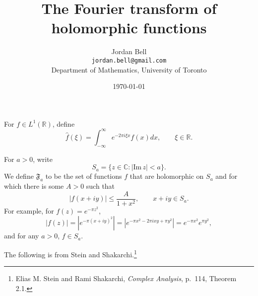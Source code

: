 \documentclass{article}
\def\Im{\ensuremath{\mathrm{Im}}\,}
\theoremstyle{definition}
\begin{document}
\title{The Fourier transform of holomorphic functions}
\author{Jordan Bell\\ \texttt{jordan.bell@gmail.com}\\Department of Mathematics, University of Toronto}
\date{\today}

\maketitle

For $f \in L^1(\mathbb{R})$, define
\[
\widehat{f}(\xi) = \int_{-\infty}^\infty e^{-2\pi i\xi x} f(x) dx,
\qquad \xi \in \mathbb{R}.
\]

For $a>0$, write
\[
S_a = \{z \in \mathbb{C}: |\Im z|<a\}.
\]
We define $\mathfrak{F}_a$ to be the set of functions $f$ that are holomorphic on $S_a$ and for which there
is some $A>0$ such that
\begin{equation}
|f(x+iy)| \leq \frac{A}{1+x^2}, \qquad x+iy \in S_a.
\label{Sa}
\end{equation}
For example, for $f(z)=e^{-\pi z^2}$, 
\[
|f(z)| = |e^{-\pi(x+iy)^2}| = |e^{-\pi x^2 - 2\pi i xy + \pi y^2}|
=e^{-\pi x^2} e^{\pi y^2},
\]
and for any $a>0$, $f \in S_a$. 

The following is from Stein and Shakarchi.\footnote{Elias M. Stein and Rami Shakarchi, {\em Complex Analysis},
p.~114, Theorem 2.1.}
\end{document}
